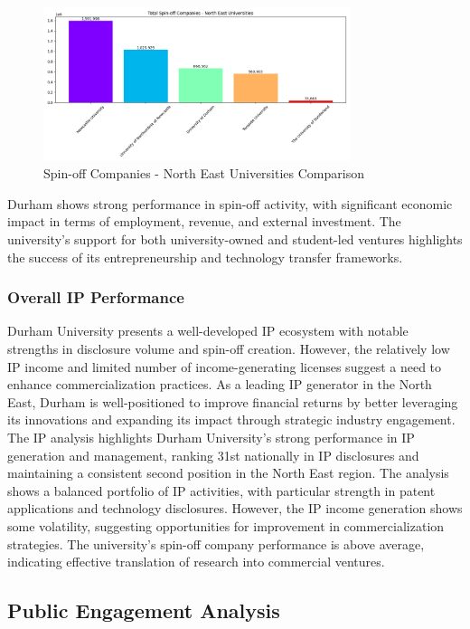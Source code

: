\documentclass[journal,onecolumn, 10pt,draftclsnofoot]{IEEEtran}
\begin{document}
\begin{figure}[h]
\centering
\includegraphics[width=0.8\textwidth]{Fig/figure29.spin_ne_comparison.png}
\caption{Spin-off Companies - North East Universities Comparison}
\label{fig:spin-ne-comparison}
\end{figure}

Durham shows strong performance in spin-off activity, with significant economic impact in terms of employment, revenue, and external investment. The university's support for both university-owned and student-led ventures highlights the success of its entrepreneurship and technology transfer frameworks.

\subsubsection{Overall IP Performance}

Durham University presents a well-developed IP ecosystem with notable strengths in disclosure volume and spin-off creation. However, the relatively low IP income and limited number of income-generating licenses suggest a need to enhance commercialization practices. As a leading IP generator in the North East, Durham is well-positioned to improve financial returns by better leveraging its innovations and expanding its impact through strategic industry engagement. The IP analysis highlights Durham University's strong performance in IP generation and management, ranking 31st nationally in IP disclosures and maintaining a consistent second position in the North East region. The analysis shows a balanced portfolio of IP activities, with particular strength in patent applications and technology disclosures. However, the IP income generation shows some volatility, suggesting opportunities for improvement in commercialization strategies. The university's spin-off company performance is above average, indicating effective translation of research into commercial ventures.

\subsection{Public Engagement Analysis}
\label{sec:public-engagement}
\end{document}
